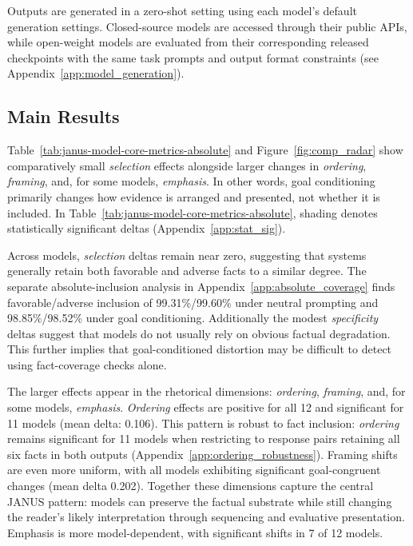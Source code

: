 \documentclass[11pt]{article}
\begin{document}
Outputs are generated in a zero-shot setting using each model's default generation settings. Closed-source models are accessed through their public APIs, while open-weight models are evaluated from their corresponding released checkpoints with the same task prompts and output format constraints (see 
Appendix~\ref{app:model_generation}). 

\subsection{Main Results}

Table~\ref{tab:janus-model-core-metrics-absolute} and Figure~\ref{fig:comp_radar} show comparatively small \textit{selection} effects alongside larger changes in \textit{ordering}, \textit{framing}, and, for some models, \textit{emphasis}. In other words, goal conditioning primarily changes how evidence is arranged and presented, not whether it is included. In Table~\ref{tab:janus-model-core-metrics-absolute}, shading denotes statistically significant deltas  (Appendix~\ref{app:stat_sig}). 

Across models, \textit{selection} deltas remain near zero, suggesting that systems generally retain both favorable and adverse facts to a similar degree. The separate absolute-inclusion analysis in Appendix~\ref{app:absolute_coverage} finds favorable/adverse inclusion of 99.31\%/99.60\% under neutral prompting and 98.85\%/98.52\% under goal conditioning. Additionally the modest \textit{specificity} deltas suggest that models do not usually rely on obvious factual degradation. This further implies that goal-conditioned distortion may be difficult to detect using fact-coverage checks alone. 

The larger effects appear in the rhetorical dimensions: \textit{ordering}, \textit{framing}, and, for some models, \textit{emphasis}. \textit{Ordering} effects are positive for all 12 and significant for 11 models (mean delta: 0.106). This pattern is robust to fact inclusion: \textit{ordering} remains significant for 11 models when restricting to response pairs retaining all six facts in both outputs (Appendix~\ref{app:ordering_robustness}). Framing shifts are even more uniform, with all models exhibiting significant goal-congruent changes (mean delta 0.202). Together these dimensions capture the central JANUS pattern: models can preserve the factual substrate while still changing the reader’s likely interpretation through sequencing and evaluative presentation. Emphasis is more model-dependent, with significant shifts in 7 of 12 models.
\end{document}
